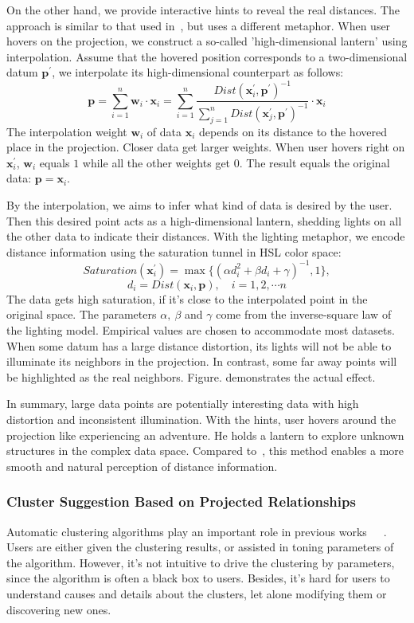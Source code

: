 On the other hand, we provide interactive hints to reveal the real distances. The approach is similar to that used in~\cite{DBLP:journals/tvcg/StahnkeDMT16}, but uses a different metaphor. When user hovers on the projection, we construct a so-called 'high-dimensional lantern' using interpolation. Assume that the hovered position corresponds to a two-dimensional datum $\mathbf{p}^{\prime}$, we interpolate its high-dimensional counterpart as follows:
$$\mathbf{p} = \sum\limits_{i=1}^{n}\mathbf{w}_{i}\cdot\mathbf{x}_{i} =  \sum\limits_{i=1}^{n}\frac{Dist(\mathbf{x}_{i}^{\prime}, \mathbf{p}^{\prime})^{-1}}{\sum\limits_{j=1}^{n}Dist(\mathbf{x}_{j}^{\prime}, \mathbf{p}^{\prime})^{-1}}\cdot\mathbf{x}_{i}$$
The interpolation weight $\mathbf{w}_{i}$ of data $\mathbf{x}_{i}$ depends on its distance to the hovered place in the projection. Closer data get larger weights. When user hovers right on $\mathbf{x}_{i}^{\prime}$, $\mathbf{w}_{i}$ equals $1$ while all the other weights get $0$. The result equals the original data: $\mathbf{p} = \mathbf{x}_{i}$.

By the interpolation, we aims to infer what kind of data is desired by the user. Then this desired point acts as a high-dimensional lantern, shedding lights on all the other data to indicate their distances. With the lighting metaphor, we encode distance information using the saturation tunnel in HSL color space:
$$Saturation(\mathbf{x}_{i}^{\prime}) = \max{\{(\alpha d_{i}^{2} + \beta d_{i} + \gamma)^{-1}, 1\}},$$
$$d_{i} = Dist(\mathbf{x}_{i}, \mathbf{p}), \quad i = 1,2,\cdots n$$
The data gets high saturation, if it's close to the interpolated point in the original space. The parameters $\alpha,\ \beta$ and $\gamma$ come from the inverse-square law of the lighting model. Empirical values are chosen to accommodate most datasets. When some datum has a large distance distortion, its lights will not be able to illuminate its neighbors in the projection. In contrast, some far away points will be highlighted as the real neighbors. Figure. demonstrates the actual effect. 

In summary, large data points are potentially interesting data with high distortion and inconsistent illumination. With the hints, user hovers around the projection like experiencing an adventure. He holds a lantern to explore unknown structures in the complex data space. Compared to~\cite{DBLP:journals/tvcg/StahnkeDMT16}, this method enables a more smooth and natural perception of distance information.

\subsubsection{Cluster Suggestion Based on Projected Relationships}
Automatic clustering algorithms play an important role in previous works~\cite{DBLP:conf/ieeevast/NamHMZI07}~\cite{DBLP:journals/cgf/LeeKCSP12}~\cite{DBLP:journals/cgf/LiuWTBP15}. Users are either given the clustering results, or assisted in toning parameters of the algorithm. However, it's not intuitive to drive the clustering by parameters, since the algorithm is often a black box to users. Besides, it's hard for users to understand causes and details about the clusters, let alone modifying them or discovering new ones.

